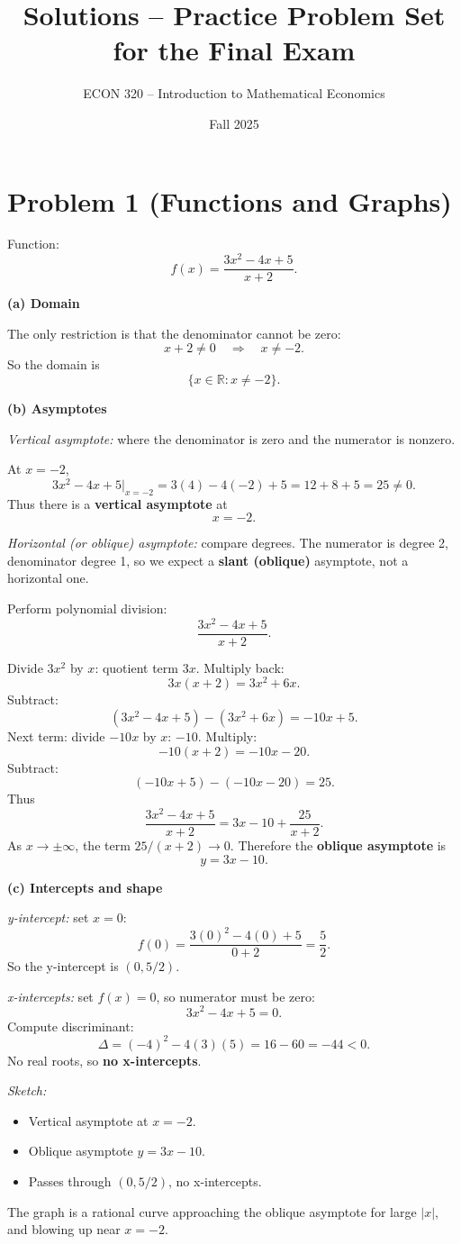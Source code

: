 \documentclass[12pt]{article}
\title{Solutions -- Practice Problem Set for the Final Exam}
\author{ECON 320 -- Introduction to Mathematical Economics}
\date{Fall 2025}
\begin{document}
\maketitle

\section*{Problem 1 (Functions and Graphs)}

Function:
\[
f(x)=\frac{3x^2 - 4x + 5}{x+2}.
\]

\textbf{(a) Domain}

The only restriction is that the denominator cannot be zero:
\[
x+2 \neq 0 \quad \Rightarrow \quad x \neq -2.
\]
So the domain is
\[
\{x \in \mathbb{R} : x \neq -2\}.
\]

\textbf{(b) Asymptotes}

\emph{Vertical asymptote:} where the denominator is zero and the numerator is nonzero.

At \(x=-2\),
\[
3x^2 -4x +5 \big|_{x=-2} = 3(4) -4(-2) +5 = 12+8+5 =25 \neq 0.
\]
Thus there is a \textbf{vertical asymptote} at
\[
x=-2.
\]

\emph{Horizontal (or oblique) asymptote:} compare degrees. The numerator is degree 2, denominator degree 1, so we expect a \textbf{slant (oblique)} asymptote, not a horizontal one.

Perform polynomial division:
\[
\frac{3x^2 - 4x + 5}{x+2}.
\]

Divide \(3x^2\) by \(x\): quotient term \(3x\). Multiply back:
\[
3x(x+2)=3x^2+6x.
\]
Subtract:
\[
(3x^2 - 4x +5) - (3x^2+6x) = -10x +5.
\]
Next term: divide \(-10x\) by \(x\): \(-10\). Multiply:
\[
-10(x+2) = -10x -20.
\]
Subtract:
\[
(-10x +5) - (-10x -20) = 25.
\]
Thus
\[
\frac{3x^2 - 4x + 5}{x+2} = 3x - 10 + \frac{25}{x+2}.
\]
As \(x\to\pm\infty\), the term \(25/(x+2) \to 0\). Therefore the \textbf{oblique asymptote} is
\[
y = 3x - 10.
\]

\textbf{(c) Intercepts and shape}

\emph{y-intercept:} set \(x=0\):
\[
f(0)=\frac{3(0)^2 -4(0) +5}{0+2}=\frac{5}{2}.
\]
So the y-intercept is \((0, 5/2)\).

\emph{x-intercepts:} set \(f(x)=0\), so numerator must be zero:
\[
3x^2 -4x +5 = 0.
\]
Compute discriminant:
\[
\Delta = (-4)^2 -4(3)(5) = 16 - 60 = -44 < 0.
\]
No real roots, so \textbf{no x-intercepts}.

\emph{Sketch:}
\begin{itemize}
    \item Vertical asymptote at \(x=-2\).
    \item Oblique asymptote \(y=3x-10\).
    \item Passes through \((0, 5/2)\), no x-intercepts.
\end{itemize}
The graph is a rational curve approaching the oblique asymptote for large \(|x|\), and blowing up near \(x=-2\).
\end{document}
